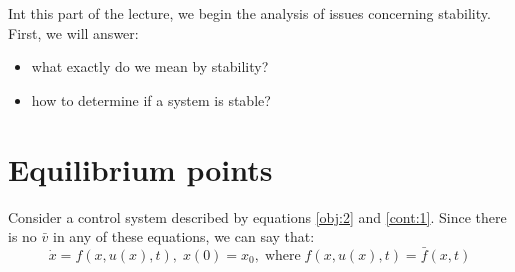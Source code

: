 Int this part of the lecture, we begin the analysis of issues concerning stability. First, we will answer:
\begin{itemize}
        \item what exactly do we mean by stability?
        \item how to determine if a system is stable?
        
\end{itemize}
\clearpage
\section{Equilibrium points}

Consider a control system described by equations \ref{obj:2} and \ref{cont:1}. 
Since there is no $\bar{v}$ in any of these equations, we can say that:
\begin{equation} 
    \label{equ:5}
    \dot{x}=f(x,u(x),t),\; x(0) = x_0,\; \text{where}\; f(x,u(x),t) = \bar{f}(x,t)
\end{equation}


